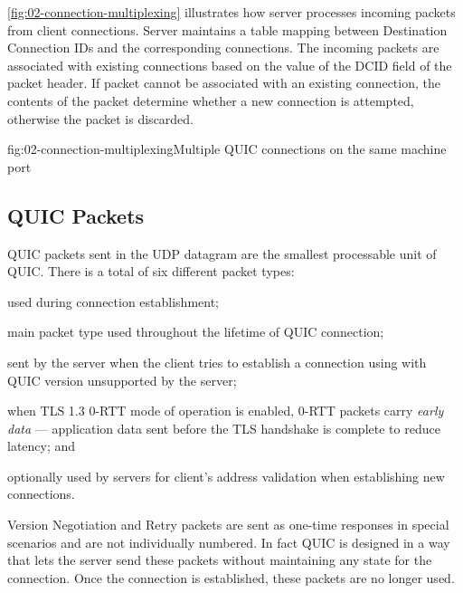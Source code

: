 \autoref{fig:02-connection-multiplexing} illustrates how server processes incoming packets from
client connections. Server maintains a table mapping between Destination Connection IDs and the
corresponding connections. The incoming packets are associated with existing connections based on
the value of the DCID field of the packet header. If packet cannot be associated with an existing
connection, the contents of the packet determine whether a new connection is attempted, otherwise
the packet is discarded.

\begin{myFigure}{fig:02-connection-multiplexing}{Multiple QUIC connections on the same machine port}




\end{myFigure}

\subsection{QUIC Packets}

QUIC packets sent in the UDP datagram are the smallest processable unit of QUIC\@. There is a total
of six different packet types:

\begin{enumerate}

   used during connection establishment;

   main packet type used throughout the lifetime of QUIC connection;

   sent by the server when the client tries to establish a connection
  using with QUIC version unsupported by the server;

   when TLS 1.3 0-RTT mode of operation is enabled, 0-RTT packets carry \textit{early
  data} --- application data sent before the TLS handshake is complete to reduce latency; and

   optionally used by servers for client's address validation when establishing new
  connections.

\end{enumerate}

Version Negotiation and Retry packets are sent as one-time responses in special scenarios and are
not individually numbered. In fact QUIC is designed in a way that lets the server send these packets
without maintaining any state for the connection. Once the connection is established, these packets
are no longer used.

